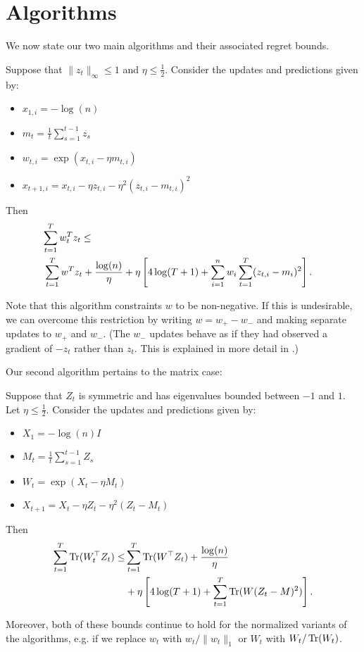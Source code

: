 \documentclass[paper_icml.tex]{subfiles}
\begin{document}
\section{Algorithms} 
\label{sec:algorithms}
We now state our two main algorithms and their associated 
regret bounds.

\begin{theorem}
Suppose that $\|z_t\|_{\infty} \leq 1$ and $\eta \leq \frac{1}{2}$. 
Consider the updates and predictions given by:
\begin{itemize}
\item $x_{1,i} = -\log(n)$
\item $m_{t} = \frac{1}{t} \sum_{s=1}^{t-1} z_s$
\item $w_{t,i} = \exp(x_{t,i} - \eta m_{t,i})$
\item $x_{t+1,i} = x_{t,i} - \eta z_{t,i} - \eta^2 (z_{t,i} - m_{t,i})^2$
\end{itemize}
Then 
\begin{align}
\nonumber
\lefteqn{\sum_{t=1}^T w_t^Tz_t \leq} \\
 & \sum_{t=1}^T w^Tz_t + \frac{\log(n)}{\eta} + \eta \left[ 4\log(T+1) + \sum_{i=1}^n w_i \sum_{t=1}^T (z_{t,i} - m_i)^2 \right].
\end{align}
\end{theorem}
Note that this algorithm constraints $w$ to be non-negative. If this is 
undesirable, we can overcome this restriction by writing $w = w_{+} - w_{-}$ 
and making separate updates to $w_{+}$ and $w_{-}$. (The $w_{-}$ updates behave 
as if they had observed a gradient of $-z_t$ rather than $z_t$. This is explained 
in more detail in \cite{kivinen1997}.)

Our second algorithm pertains to the matrix case:
\begin{theorem}
Suppose that $Z_t$ is symmetric and has eigenvalues bounded between $-1$ and $1$. 
Let $\eta \leq \frac{1}{2}$. Consider the updates and predictions given by:
\begin{itemize}
\item $X_1 = -\log(n)I$
\item $M_t = \frac{1}{t} \sum_{s=1}^{t-1} Z_s$
\item $W_t = \exp(X_t - \eta M_t)$
\item $X_{t+1} = X_t - \eta Z_t - \eta^2 (Z_t - M_t)$
\end{itemize}
Then
\begin{align}
\sum_{t=1}^T \operatorname{Tr}(W_t^{\top}Z_t) \leq & \sum_{t=1}^T \operatorname{Tr}(W^{\top}Z_t) + \frac{\log(n)}{\eta} \\
 & + \eta \left[ 4\log(T+1) + \sum_{t=1}^T \operatorname{Tr}(W(Z_t-M)^2)\right].
\end{align}
\end{theorem}
Moreover, both of these bounds continue to hold for the normalized variants of the 
algorithms, e.g. if we replace $w_t$ with $w_t/\|w_t\|_1$ or $W_t$ with 
$W_t/\operatorname{Tr}(W_t)$.
\end{document}
